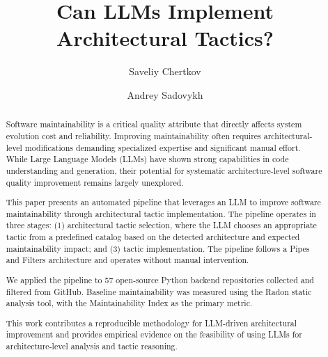 \documentclass[sigconf,review,anonymous]{acmart}
\begin{document}
\title{Can LLMs Implement Architectural Tactics?}

\author{Saveliy Chertkov}

\author{Andrey Sadovykh}

\begin{abstract}

Software maintainability is a critical quality attribute that directly affects system evolution cost and reliability. Improving maintainability often requires architectural-level modifications demanding specialized expertise and significant manual effort. While Large Language Models (LLMs) have shown strong capabilities in code understanding and generation, their potential for systematic architecture-level software quality improvement remains largely unexplored.

This paper presents an automated pipeline that leverages an LLM to improve software maintainability through architectural tactic implementation. The pipeline operates in three stages: (1) architectural tactic selection, where the LLM chooses an appropriate tactic from a predefined catalog based on the detected architecture and expected maintainability impact; and (3) tactic implementation. The pipeline follows a Pipes and Filters architecture and operates without manual intervention.

We applied the pipeline to 57 open-source Python backend repositories collected and filtered from GitHub. Baseline maintainability was measured using the Radon static analysis tool, with the Maintainability Index as the primary metric.

This work contributes a reproducible methodology for LLM-driven architectural improvement and provides  empirical evidence on the feasibility of using LLMs for architecture-level analysis and tactic reasoning.

\end{abstract}


\maketitle
\end{document}
